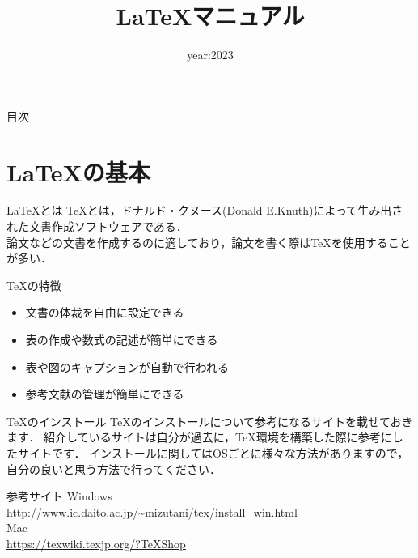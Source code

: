 \documentclass[aspectratio=169, dvipdfmx, 12pt]{beamer}
\title{LaTeXマニュアル}
\subtitle{}
\author[著者略称]{}
\institute[所属略称]{}
\date{year:2023}
\begin{document}
\frame{\maketitle}
\begin{frame}
  {\Large 目次}
   \tableofcontents  
  \end{frame}
\section{LaTeXの基本}
\begin{frame}{LaTeXとは}
    TeXとは，ドナルド・クヌース(Donald E.Knuth)によって生み出された文書作成ソフトウェアである．\\
    論文などの文書を作成するのに適しており，論文を書く際はTeXを使用することが多い．
  \begin{block}{TeXの特徴}
    \begin{itemize}
      \item 文書の体裁を自由に設定できる
      \item 表の作成や数式の記述が簡単にできる
      \item 表や図のキャプションが自動で行われる
      \item 参考文献の管理が簡単にできる
    \end{itemize}
  \end{block}
\end{frame}

\begin{frame}{TeXのインストール}
  TeXのインストールについて参考になるサイトを載せておきます．
  紹介しているサイトは自分が過去に，TeX環境を構築した際に参考にしたサイトです．
  インストールに関してはOSごとに様々な方法がありますので，自分の良いと思う方法で行ってください．
  \begin{block}{参考サイト}
    Windows\\
    {\color{blue}\url{http://www.ic.daito.ac.jp/~mizutani/tex/install_win.html}}\cite{WinTeX}\\
    Mac\\
    {\color{blue}\url{https://texwiki.texjp.org/?TeXShop}}\cite{MacTeX}
  \end{block}
\end{frame}
\end{document}
